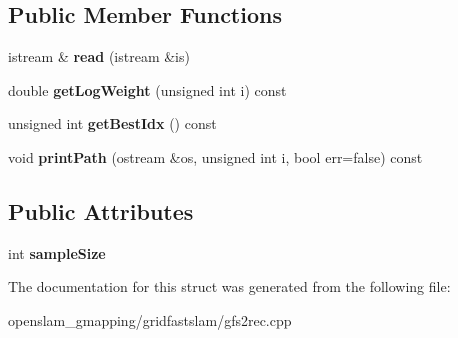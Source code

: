 \subsection*{Public Member Functions}
\begin{DoxyCompactItemize}
\item 
\mbox{\label{structRecordList_a19d3a32065e54d4145fefa8aa79d07df}} 
istream \& {\bfseries read} (istream \&is)
\item 
\mbox{\label{structRecordList_ac5a7c67f0500967a2d2d66aa9ace7ce3}} 
double {\bfseries get\+Log\+Weight} (unsigned int i) const
\item 
\mbox{\label{structRecordList_a6585fcf4df6458b85694dd2c23840f1e}} 
unsigned int {\bfseries get\+Best\+Idx} () const
\item 
\mbox{\label{structRecordList_a4b58b973fbd984b4e03047a49dec4c36}} 
void {\bfseries print\+Path} (ostream \&os, unsigned int i, bool err=false) const
\end{DoxyCompactItemize}
\subsection*{Public Attributes}
\begin{DoxyCompactItemize}
\item 
\mbox{\label{structRecordList_ab9854d48ec1526ed1900be06c88881ce}} 
int {\bfseries sample\+Size}
\end{DoxyCompactItemize}


The documentation for this struct was generated from the following file\+:\begin{DoxyCompactItemize}
\item 
openslam\+\_\+gmapping/gridfastslam/gfs2rec.\+cpp\end{DoxyCompactItemize}
